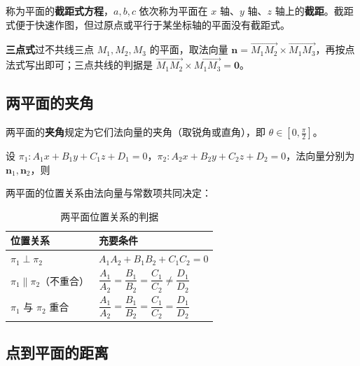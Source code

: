 
称为平面的\textbf{截距式方程}，$a,b,c$ 依次称为平面在 $x$ 轴、$y$ 轴、$z$ 轴上的\textbf{截距}。截距式便于快速作图，但过原点或平行于某坐标轴的平面没有截距式。

\textbf{三点式}\quad 过不共线三点 $M_1,M_2,M_3$ 的平面，取法向量 $\boldsymbol{n}=\overrightarrow{M_1M_2}\times\overrightarrow{M_1M_3}$，再按点法式写出即可；三点共线的判据是 $\overrightarrow{M_1M_2}\times\overrightarrow{M_1M_3}=\boldsymbol{0}$。

\subsection{两平面的夹角}

\begin{definition}
两平面的\textbf{夹角}规定为它们法向量的夹角（取锐角或直角），即 $\theta\in\left[0,\frac{\pi}{2}\right]$。
\end{definition}

设 $\pi_1:A_1x+B_1y+C_1z+D_1=0$，$\pi_2:A_2x+B_2y+C_2z+D_2=0$，法向量分别为 $\boldsymbol{n}_1,\boldsymbol{n}_2$，则


两平面的位置关系由法向量与常数项共同决定：

\begin{table}[htbp]
\centering
\renewcommand{\tablename}{表}
\caption{两平面位置关系的判据}
\begin{tabular}{@{}ll@{}}
\toprule
位置关系 & 充要条件 \\
\midrule
$\pi_1\perp\pi_2$ & $A_1A_2+B_1B_2+C_1C_2=0$ \\
$\pi_1\parallel\pi_2$（不重合） & $\dfrac{A_1}{A_2}=\dfrac{B_1}{B_2}=\dfrac{C_1}{C_2}\neq\dfrac{D_1}{D_2}$ \\
$\pi_1$ 与 $\pi_2$ 重合 & $\dfrac{A_1}{A_2}=\dfrac{B_1}{B_2}=\dfrac{C_1}{C_2}=\dfrac{D_1}{D_2}$ \\
\bottomrule
\end{tabular}
\end{table}

\subsection{点到平面的距离}

